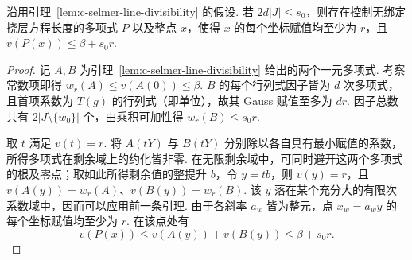 \begin{lemma}[直线上的共同低赋值点]
\label{lem:c-selmer-line-point}
\emitthmsource
沿用引理~\ref{lem:c-selmer-line-divisibility} 的假设.
若 $2d|J|\le s_0$，则存在控制无绑定挠层方程长度的多项式 $P$ 以及整点 $x$，使得 $x$ 的每个坐标赋值均至少为 $r$，且 $v(P(x))\le\beta+s_0 r$.
\end{lemma}
\begin{proof}
记 $A,B$ 为引理~\ref{lem:c-selmer-line-divisibility} 给出的两个一元多项式.
考察常数项即得 $w_r(A)\le v(A(0))\le\beta$.
$B$ 的每个行列式因子皆为 $d$ 次多项式，且首项系数为 $T(g)$ 的行列式（即单位），故其 Gauss 赋值至多为 $dr$.
因子总数共有 $2|J\setminus\{w_0\}|$ 个，由乘积可加性得 $w_r(B)\le s_0r$.

取 $t$ 满足 $v(t)=r$. 将 $A(tY)$ 与 $B(tY)$ 分别除以各自具有最小赋值的系数，所得多项式在剩余域上的约化皆非零.
在无限剩余域中，可同时避开这两个多项式的根及零点；取如此所得剩余值的整提升 $b$，令 $y=tb$，则 $v(y)=r$，且 $v(A(y))=w_r(A)$、$v(B(y))=w_r(B)$.
该 $y$ 落在某个充分大的有限次系数域中，因而可以应用前一条引理.
由于各斜率 $a_w$ 皆为整元，点 $x_w=a_wy$ 的每个坐标赋值均至少为 $r$. 在该点处有
\[
 v(P(x))\le v(A(y))+v(B(y))\le\beta+s_0r .
\]
\end{proof}

